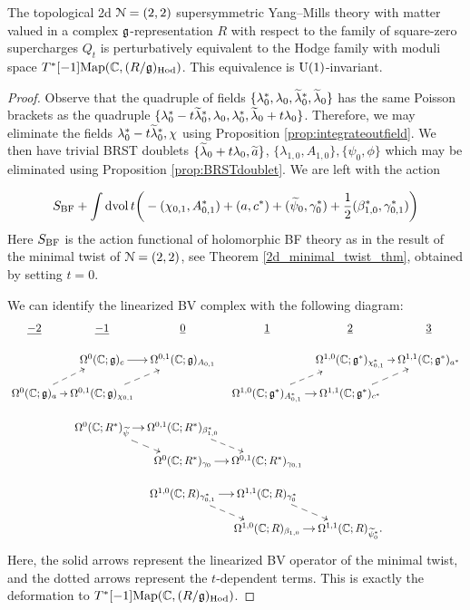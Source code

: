 \documentclass[10pt, oneside]{article}
\begin{document}
\begin{theorem} \label{2d_2_A_twist_thm}
The topological 2d $\mc N=(2,2)$ supersymmetric Yang--Mills theory with matter valued in a complex $\fg$-representation $R$ with respect to the family of square-zero supercharges $Q_t$ is perturbatively equivalent to the Hodge family with moduli space $T^*[-1]\mr{Map}(\CC, (R/\gg)_{\mr{Hod}})$.  
This equivalence is $\mr U(1)$-invariant.
\end{theorem}

\begin{proof}
Observe that the quadruple of fields $\{\lambda_0^*, \lambda_0, \Tilde{\lambda}_0^*, \Tilde{\lambda}_0\}$ has the same Poisson brackets as the quadruple $\{\lambda_0^* - t \Tilde{\lambda}_0^*, \lambda_0, \lambda_0^*, \Tilde{\lambda}_0 + t \lambda_0\}$. 
Therefore, we may eliminate the fields $\lambda_0^*-t\wt\lambda_0^*, \chi$ using Proposition \ref{prop:integrateoutfield}. 
We then have trivial BRST doublets $\{\wt\lambda_0 + t\lambda_0, \wt a\}$, $\{\lambda_{1,0}, A_{1,0}\}, \{\psi_0, \phi\}$ which may be eliminated using Proposition \ref{prop:BRSTdoublet}. We are left with the action

\[
S_{\mr{BF}} + \int \dvol t \bigg( -(\chi_{0,1}, A_{0,1}^*) + (a, c^*) + (\Tilde{\psi}_0, \gamma_0^*) + \frac{1}{2} (\beta_{1,0}^*, \gamma_{0,1}^*) \bigg) 
\]
Here $S_{\mr{BF}}$ is the action functional of holomorphic BF theory as in the result of the minimal twist of $\cN=(2,2)$, see Theorem \ref{2d_minimal_twist_thm}, obtained by setting $t = 0$. 

We can identify the linearized BV complex with the following diagram:
\[\xymatrix@R=0.4cm@C=0.2cm{
\ul{-2} & \ul{-1} & \ul{0} & \ul{1} & \ul{2} & \ul{3} \\
&\Omega^0(\CC; \gg)_{c} \ar[r] &\Omega^{0,1}(\CC; \gg)_{A_{0,1}} & & \Omega^{1,0}(\CC; \gg^*)_{\chi_{0,1}^*} \ar[r] &\Omega^{1,1}(\CC; \gg^*)_{a^*} \\
\Omega^0(\CC; \gg)_{a} \ar[r] \ar@{-->}[ur] &\Omega^{0,1}(\CC; \gg)_{\chi_{0,1}} \ar@{-->}[ur] && \Omega^{1,0}(\CC; \gg^*)_{A_{0,1}^*} \ar[r] \ar@{-->}[ur] &\Omega^{1,1}(\CC; \gg^*)_{c^*} \ar@{-->}[ur]\\
&\Omega^0(\CC; R^*)_{\Tilde{\psi}} \ar[r] \ar@{-->}[dr] &\Omega^{0,1}(\CC; R^*)_{\beta_{1,0}^*} \ar@{-->}[dr] &&&\\
&& \Omega^0(\CC; R^*)_{\gamma_0} \ar[r]  &\Omega^{0,1}(\CC; R^*)_{\gamma_{0,1}} &&\\
&&\Omega^{1,0}(\CC; R)_{\gamma_{0,1}^*} \ar[r] \ar@{-->}[dr] &\Omega^{1,1}(\CC;  R)_{\gamma_0^*} \ar@{-->}[dr] &&\\
&&& \Omega^{1,0}(\CC; R)_{\beta_{1,0}} \ar[r]  &\Omega^{1,1}(\CC; R)_{\Tilde{\psi}_0^*}. &\\
}\]
Here, the solid arrows represent the linearized BV operator of the minimal twist, and the dotted arrows represent the $t$-dependent terms.
This is exactly the deformation to $T^*[-1]\mr{Map}(\CC, (R/\gg)_{\mr{Hod}})$.
\end{proof}
\end{document}
